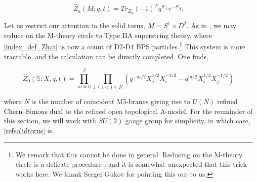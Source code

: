 \documentclass{article}
\def\be{\begin{equation}}
\def\ee{\end{equation}}
\numberwithin{corollary}{theorem}
\numberwithin{corollary}{proposition}
\begin{document}
\be \label{index_def_Zhat}\hat{Z}_a(M;q,t) = Tr_{Z_a} (-1)^F q^{S'_1} \tau^{- S'_2}.\ee 

Let us restrict our attention to the solid torus, $M = S^1\times D^2$. As in \cite{AS}, we may reduce on the M-theory circle to Type IIA superstring theory, where \eqref{index_def_Zhat} is now a count of D2-D4 BPS particles.\footnote{We remark that this cannot be done in general. Reducing on the M-theory circle is a delicate procedure \cite{GHP}, and it is somewhat unexpected that this trick works here. We thank Sergei Gukov for pointing this out to us.} This system is more tractable, and the calculation can be directly completed. One finds, 

\be \label{refsolidtorus} \hat{Z}_0 (\mathbb{S};X,q,t) = \prod_{m=0}^\beta \prod_{1\leq i < j \leq N} \left( q^{-m/2} X_j ^{1/2}X_i ^{-1/2}-q^{m/2} X_i ^{1/2}X_j ^{-1/2} \right)\ee

where $N$ is the number of coincident M5-branes giving rise to $U(N)$ refined Chern--Simons dual to the refined open topological A-model. For the remainder of this section, we will work with $SU(2)$ gauge group for simplicity, in which case, \eqref{refsolidtorus} is,
\end{document}
